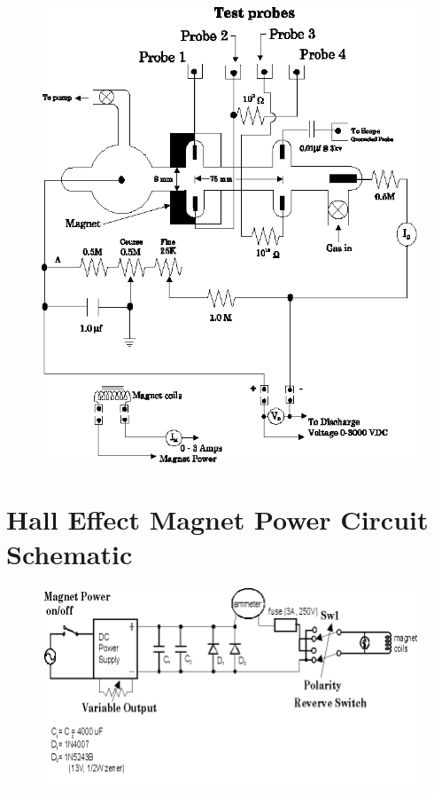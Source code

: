\documentclass{../lab}
\begin{document}
\begin{figure}[h]
    \centering
    \href{http://experimentationlab.berkeley.edu/sites/default/files/images/DiagramAppartatus.png}{\includegraphics[width=\linewidth]{images/DiagramAppartatus.png}}
    \label{fig:DiagramAppartatus}
\end{figure}

\section{Hall Effect Magnet Power Circuit Schematic}

\begin{figure}[h]
    \centering
    \href{http://experimentationlab.berkeley.edu/sites/default/files/images/MagnetReverseCiruit02.png}{\includegraphics[width=\linewidth]{images/MagnetReverseCiruit02.png}}
    \label{fig:MagnetReverseCiruit02}
\end{figure}
\end{document}
